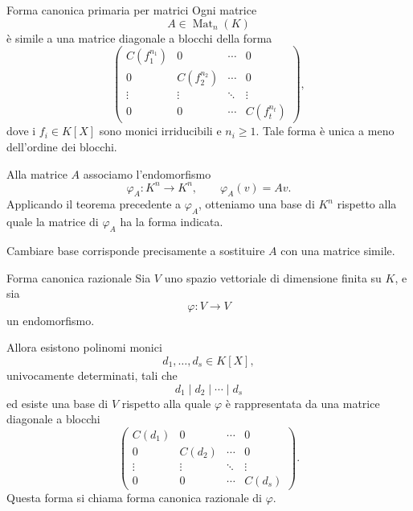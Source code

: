 \documentclass[a4paper]{article}
\begin{document}
\begin{radioactive}
\begin{snippetcorollary}{Forma canonica primaria per matrici}
    Ogni matrice
    \[
        A\in \operatorname{Mat}_n(K)
    \]
    è simile a una matrice diagonale a blocchi della forma
    \[
        \begin{pmatrix}
            C(f_1^{n_1}) & 0 & \cdots & 0\\
            0 & C(f_2^{n_2}) & \cdots & 0\\
            \vdots & \vdots & \ddots & \vdots\\
            0 & 0 & \cdots & C(f_t^{n_t})
        \end{pmatrix},
    \]
    dove i \(f_i\in K[X]\) sono monici irriducibili e \(n_i\geq 1\).
    Tale forma è unica a meno dell'ordine dei blocchi.
\end{snippetcorollary}
\end{radioactive}

\begin{radioactive}
\begin{snippetproof}{}
    Alla matrice \(A\) associamo l'endomorfismo
    \[
        \varphi_A\colon K^n\to K^n,
        \qquad
        \varphi_A(v)=Av.
    \]
    Applicando il teorema precedente a \(\varphi_A\), otteniamo una base di \(K^n\) rispetto alla quale la matrice di \(\varphi_A\) ha la forma indicata.

    Cambiare base corrisponde precisamente a sostituire \(A\) con una matrice simile.
\end{snippetproof}
\end{radioactive}

\begin{radioactive}
\begin{snippetcorollary}{Forma canonica razionale}
    Sia \(V\) uno spazio vettoriale di dimensione finita su \(K\), e sia
    \[
        \varphi\colon V\to V
    \]
    un endomorfismo.

    Allora esistono polinomi monici
    \[
        d_1,\ldots,d_s\in K[X],
    \]
    univocamente determinati, tali che
    \[
        d_1\mid d_2\mid\cdots\mid d_s
    \]
    ed esiste una base di \(V\) rispetto alla quale \(\varphi\) è rappresentata da una matrice diagonale a blocchi
    \[
        \begin{pmatrix}
            C(d_1) & 0 & \cdots & 0\\
            0 & C(d_2) & \cdots & 0\\
            \vdots & \vdots & \ddots & \vdots\\
            0 & 0 & \cdots & C(d_s)
        \end{pmatrix}.
    \]
    Questa forma si chiama forma canonica razionale di \(\varphi\).
\end{snippetcorollary}
\end{radioactive}
\end{document}
